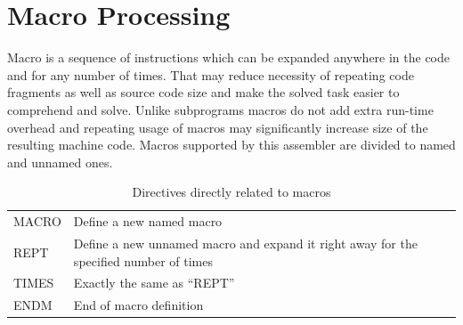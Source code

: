 \documentclass[a4paper,twoside,12pt]{book}
\newcommand{\mysmallfont}{\fontsize{8pt}{10pt} \selectfont{}}
\begin{document}
	\clearpage
	\section{Macro Processing}
		Macro is a sequence of instructions which can be expanded anywhere in the code and for any number of times. That may reduce necessity of repeating code fragments as well as source code size and make the solved task easier to comprehend and solve. Unlike subprograms macros do not add extra run-time overhead and repeating usage of macros may significantly increase size of the resulting machine code. Macros supported by this assembler are divided to named and unnamed ones.

		\begin{table}[h!]
			\centering{}
			\mysmallfont{}
			\begin{tabular}{|ll|}
				\hline
				MACRO	& Define a new named macro \\
				REPT	& Define a new unnamed macro and expand it right away for the specified number of times \\
				TIMES	& Exactly the same as ``REPT'' \\
				ENDM	& End of macro definition \\
				\hline
			\end{tabular}
			\caption{Directives directly related to macros}
		\end{table}
\end{document}
